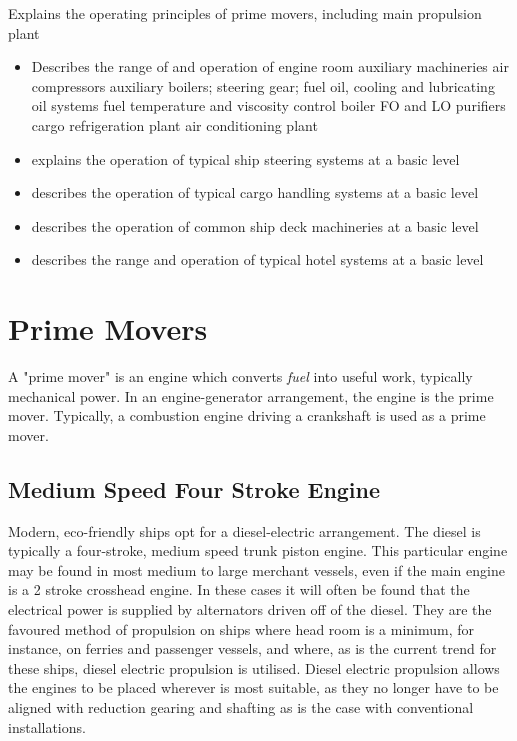 \documentclass[11pt,a4paper]{article}
\begin{document}
\tableofcontents
\newpage
\begin{tcolorbox}[colback=red!5!white,colframe=red!75!black,title=\textbf{Demonstrate basic knowledge of the operation of mechanical engineering machinery systems on board}]
Explains the operating principles of prime movers, including main propulsion plant
\begin{itemize}
\item Describes the range of and operation of engine room auxiliary machineries
    \subitem air compressors
    \subitem auxiliary boilers; steering gear; fuel oil, cooling and lubricating oil systems
    \subitem fuel temperature and viscosity control
    \subitem boiler
    \subitem FO and LO purifiers
    \subitem cargo refrigeration plant
    \subitem air conditioning plant
\item explains the operation of typical ship steering systems at a basic level
\item describes the operation of typical cargo handling systems at a basic level
\item describes the operation of common ship deck machineries at a basic level
\item describes the range and operation of typical hotel systems at a basic level
\end{itemize}
\end{tcolorbox}
\section{Prime Movers}
A "prime mover" is an engine which converts \textit{fuel} into useful work, typically mechanical power. In an engine-generator arrangement, the engine is the prime mover. Typically, a combustion engine driving a crankshaft is used as a prime mover.

\subsection{Medium Speed Four Stroke Engine}
Modern, eco-friendly ships opt for a diesel-electric arrangement. The diesel is typically a four-stroke, medium speed trunk piston engine. This particular engine may be found in most medium to large merchant vessels, even if the main engine is a 2 stroke crosshead engine. In these cases it will often be found that the electrical power is supplied by alternators driven off of the diesel. They are the favoured method of propulsion on ships where  head room is a minimum, for instance, on ferries and passenger vessels, and where, as is the current trend for these ships, diesel electric propulsion is utilised. Diesel electric propulsion allows the engines to be placed wherever is most suitable, as they no longer have to be aligned with reduction gearing and shafting as is the case with conventional installations.
\end{document}
